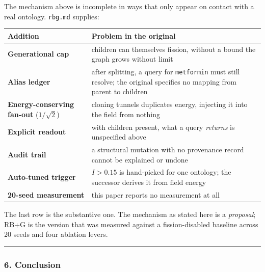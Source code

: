 \documentclass[
  11pt,
  a4paper,
]{article}
\begin{document}
The mechanism above is incomplete in ways that only appear on contact
with a real ontology. \texttt{rbg.md} supplies:

\begin{longtable}[]{@{}
  >{\raggedright\arraybackslash}p{}
  >{\raggedright\arraybackslash}p{}@{}}
\toprule\noalign{}
\begin{minipage}[b]{\linewidth}\raggedright
Addition
\end{minipage} & \begin{minipage}[b]{\linewidth}\raggedright
Problem in the original
\end{minipage} \\
\midrule\noalign{}
\endhead
\bottomrule\noalign{}
\endlastfoot
\textbf{Generational cap} & children can themselves fission, without a
bound the graph grows without limit \\
\textbf{Alias ledger} & after splitting, a query for \texttt{metformin}
must still resolve; the original specifies no mapping from parent to
children \\
\textbf{Energy-conserving fan-out} (\(1/\sqrt{2}\)) & cloning tunnels
duplicates energy, injecting it into the field from nothing \\
\textbf{Explicit readout} & with children present, what a query
\emph{returns} is unspecified above \\
\textbf{Audit trail} & a structural mutation with no provenance record
cannot be explained or undone \\
\textbf{Auto-tuned trigger} & \(I > 0.15\) is hand-picked for one
ontology; the successor derives it from field energy \\
\textbf{20-seed measurement} & this paper reports no measurement at
all \\
\end{longtable}

The last row is the substantive one. The mechanism as stated here is a
\emph{proposal}; RB+G is the version that was measured against a
fission-disabled baseline across 20 seeds and four ablation levers.

\begin{center}\rule{0.5\linewidth}{0.5pt}\end{center}

\subsubsection{6. Conclusion}\label{conclusion}
\end{document}
